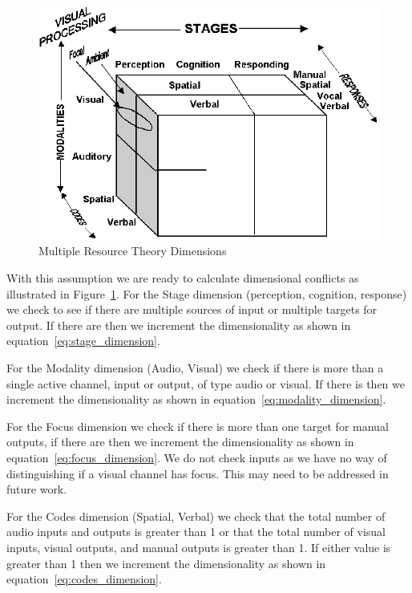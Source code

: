 \begin{figure}[h]
\begin{center}
\includegraphics[width=6in]{multresourcetheory.png}
\caption{Multiple Resource Theory Dimensions~\cite{wickens2002multiple}}
\label{fig:multipleresourcetheory}
\end{center}
\end{figure}

With this assumption we are ready to calculate dimensional conflicts as illustrated in Figure~\ref{fig:multipleresourcetheory}.
For the Stage dimension (perception, cognition, response) we check to see if there are multiple sources of input or multiple targets for output.  If there are then we increment the dimensionality as shown in equation~\ref{eq:stage_dimension}.  

For the Modality dimension (Audio, Visual) we check if there is more than a single active channel, input or output, of type audio or visual.  If there is then we increment the dimensionality as shown in equation~\ref{eq:modality_dimension}.

For the Focus dimension we check if there is more than one target for manual outputs, if there are then we increment the dimensionality as shown in equation~\ref{eq:focus_dimension}.  We do not check inputs as we have no way of distinguishing if a visual channel has focus.  This may need to be addressed in future work. 

For the Codes dimension (Spatial, Verbal) we check that the total number of audio inputs and outputs is greater than 1 or that the total number of visual inputs, visual outputs, and manual outputs is greater than 1.  If either value is greater than 1 then we increment the dimensionality as shown in equation~\ref{eq:codes_dimension}.


